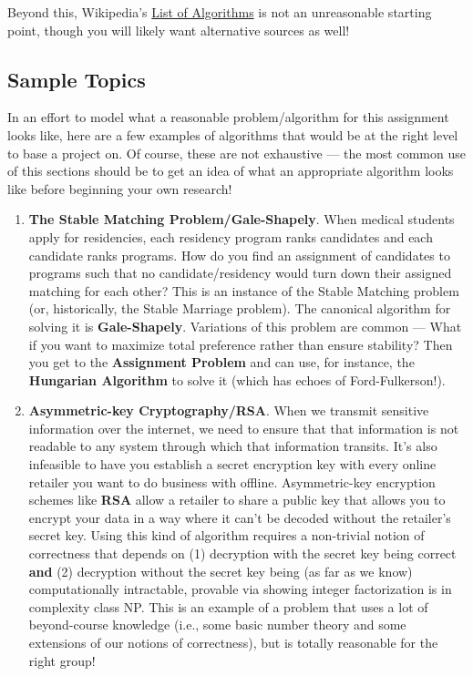 \documentclass{article}
\begin{document}
Beyond this, Wikipedia's \href{https://en.wikipedia.org/wiki/List_of_algorithms}{List of Algorithms} is not an unreasonable starting point, though you will likely want alternative sources as well!

\subsection{Sample Topics}
In an effort to model what a reasonable problem/algorithm for this assignment looks like, here are a few examples of algorithms that would be at the right level to base a project on. Of course, these are not exhaustive --- the most common use of this sections should be to get an idea of what an appropriate algorithm looks like before beginning your own research!

\begin{enumerate}
    \item \textbf{The Stable Matching Problem/Gale-Shapely}. When medical students apply for residencies, each residency program ranks candidates and each candidate ranks programs. How do you find an assignment of candidates to programs such that no candidate/residency would turn down their assigned matching for each other? This is an instance of the Stable Matching problem (or, historically, the Stable Marriage problem). The canonical algorithm for solving it is \textbf{Gale-Shapely}. Variations of this problem are common --- What if you want to maximize total preference rather than ensure stability? Then you get to the \textbf{Assignment Problem} and can use, for instance, the \textbf{Hungarian Algorithm} to solve it (which has echoes of Ford-Fulkerson!). 

    \item \textbf{Asymmetric-key Cryptography/RSA}. When we transmit sensitive information over the internet, we need to ensure that that information is not readable to any system through which that information transits. It's also infeasible to have you establish a secret encryption key with every online retailer you want to do business with offline. Asymmetric-key encryption schemes like \textbf{RSA} allow a retailer to share a public key that allows you to encrypt your data in a way where it can't be decoded without the retailer's secret key. Using this kind of algorithm requires a non-trivial notion of correctness that depends on (1) decryption with the secret key being correct \textbf{and} (2) decryption without the secret key being (as far as we know) computationally intractable, provable via showing integer factorization is in complexity class NP. This is an example of a problem that uses a lot of beyond-course knowledge (i.e., some basic number theory and some extensions of our notions of correctness), but is totally reasonable for the right group!


\end{enumerate}
\end{document}
